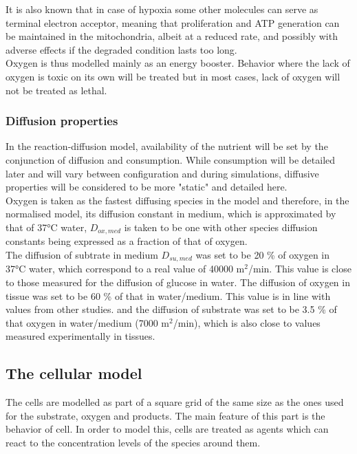 \documentclass[11pt,a4paper]{article}
\begin{document}
It is also known that in case of hypoxia some other molecules can serve as terminal electron acceptor, meaning that proliferation and ATP generation can be maintained in the mitochondria, albeit at a reduced rate, and possibly with adverse effects if the degraded condition lasts too long.\cite{Spinelli2021}\\

Oxygen is thus modelled mainly as an energy booster. Behavior where the lack of oxygen is toxic on its own will be treated but in most cases, lack of oxygen will not be treated as lethal.\\


\subsubsection{Diffusion properties}
In the reaction-diffusion model, availability of the nutrient will be set by the conjunction of diffusion and consumption. While consumption will be detailed later and will vary between configuration and during simulations, diffusive properties will be considered to be more "static" and detailed here.\\

Oxygen is taken as the fastest diffusing species in the model and therefore, in the normalised model, its diffusion constant in medium, which is approximated by that of 37°C water, $D_{ox,med}$ is taken to be one with other species diffusion constants being expressed as a fraction of that of oxygen.\\

The diffusion of subtrate in medium $D_{su,med}$ was set to be 20 \% of oxygen in 37°C water, which correspond to a real value of 40000 \textmu m$^2$/min. This value is close to those measured for the diffusion of glucose in water.\cite{Hober1947} The diffusion of oxygen in tissue was set to be 60 \% of that in water/medium. This value is in line with values from other studies.\cite{Mao2018}\cite{Grote1977} and the diffusion of substrate was set to be 3.5 \% of that oxygen in water/medium (7000 \textmu m$^2$/min), which is also close to values measured experimentally in tissues.\cite{Grote1977}\cite{Pfeuffer2000}\\


\subsection{The cellular model}
The cells are modelled as part of a square grid of the same size as the ones used for the substrate, oxygen and products. The main feature of this part is the behavior of cell. In order to model this, cells  are treated as agents which can react to the concentration levels of the species around them.\\
\end{document}
